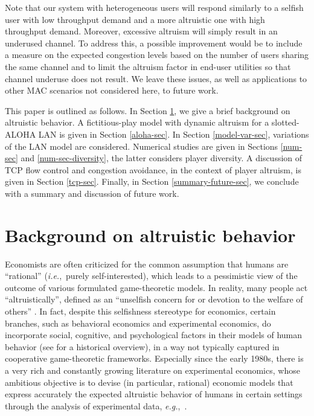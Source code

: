 \documentclass[12pt,onecolumn,draftcls]{IEEEtran}
\newcommand{\ie}{{\em i.e.},~}
\newcommand{\eg}{{\em e.g.},~}
\begin{document}
Note that our system with heterogeneous users will respond similarly to a
selfish user with low throughput demand and a more altruistic one with high
throughput demand. Moreover, excessive altruism will simply result in an
underused  channel. To address this, a possible improvement would be to
include a measure on the expected congestion levels based on the number of
users sharing the same channel and to limit the altruism factor in end-user
utilities so that channel underuse does not result.  
We leave these
issues, as well as applications to other MAC scenarios not considered here,
to future work.

This paper is outlined as follows. In Section \ref{altr-sec}, we give a
brief background on altruistic behavior. A fictitious-play model with
dynamic altruism for a slotted-ALOHA LAN is given in Section
\ref{aloha-sec}.  In Section \ref{model-var-sec}, variations of the LAN
model are considered.
Numerical studies are given in Sections \ref{num-sec}
and \ref{num-sec-diversity}, the latter considers player diversity.  A
discussion of TCP flow control and congestion avoidance, in the context of
player altruism, is given in Section \ref{tcp-sec}.  Finally, in Section
\ref{summary-future-sec}, we conclude with a summary and discussion of
future work.


\section{Background on altruistic behavior}\label{altr-sec}

Economists are often criticized for the common assumption 
that humans are ``rational'' (\ie purely self-interested), 
which leads to a pessimistic view of the outcome of various 
formulated game-theoretic models.  In reality, many people act 
``altruistically'', defined as an ``unselfish concern for 
or devotion to the welfare of others'' \cite{altruism-def}.
In fact, despite this selfishness stereotype for economics, 
certain branches, such as behavioral economics and 
experimental economics, do incorporate social, cognitive,
and psychological factors in their models of human behavior
(see  \cite{loss-aversion} for a historical overview), in a way
not typically captured in  cooperative game-theoretic frameworks.
Especially since the early 1980s, there is a very rich and constantly 
growing literature on experimental economics,
whose ambitious objective is to devise (in particular, rational) 
economic models that express accurately the expected altruistic 
behavior of humans in certain settings through the analysis of 
experimental data, \eg \cite{ledyard, levitt}.
\end{document}

